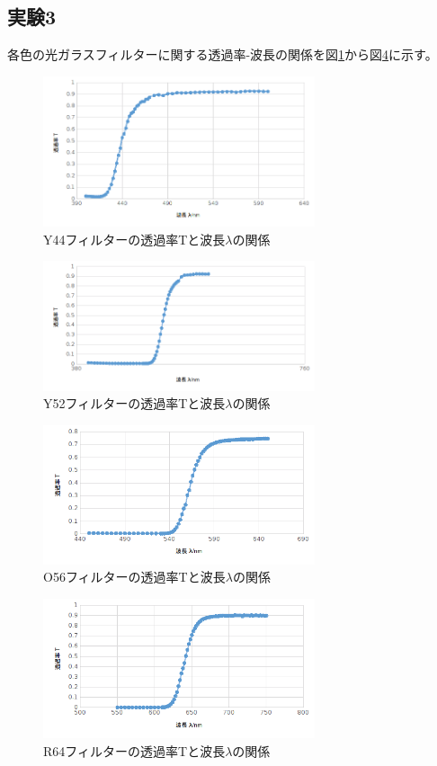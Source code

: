 \documentclass[11pt,a4j]{jsarticle}
\begin{document}
  \clearpage
  
  \subsection{実験3}
  
  各色の光ガラスフィルターに関する透過率-波長の関係を図\ref{fig:Y44}から図\ref{fig:R64}に示す。
  
  \begin{figure}[htbp]
  \centering
  \includegraphics[width=8cm,clip]{2_3_Y44.png}
  \caption{Y44フィルターの透過率Tと波長$\lambda$の関係}
  \label{fig:Y44}
 \end{figure}%
  
  
  \begin{figure}[htbp]
  \centering
  \includegraphics[width=8cm,clip]{2_3_Y52.png}
  \caption{Y52フィルターの透過率Tと波長$\lambda$の関係}
  \label{fig:Y52}
 \end{figure}%
 
 \begin{figure}[htbp]
  \centering
  \includegraphics[width=8cm,clip]{2_3_O56.png}
  \caption{O56フィルターの透過率Tと波長$\lambda$の関係}
  \label{fig:56}
 \end{figure}%
 
 \begin{figure}[htbp]
  \centering
  \includegraphics[width=8cm,clip]{2_3_R64.png}
  \caption{R64フィルターの透過率Tと波長$\lambda$の関係}
  \label{fig:R64}
 \end{figure}%
 
\end{document}
